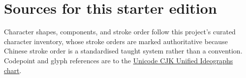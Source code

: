 
\backmatter





\chapter*{Sources for this starter edition}

Character shapes, components, and stroke order follow this project's curated
character inventory, whose stroke orders are marked authoritative because Chinese
stroke order is a standardised taught system rather than a convention. Codepoint and glyph references are to the
\href{https://www.unicode.org/charts/PDF/U4E00.pdf}{Unicode CJK Unified
Ideographs chart}.




